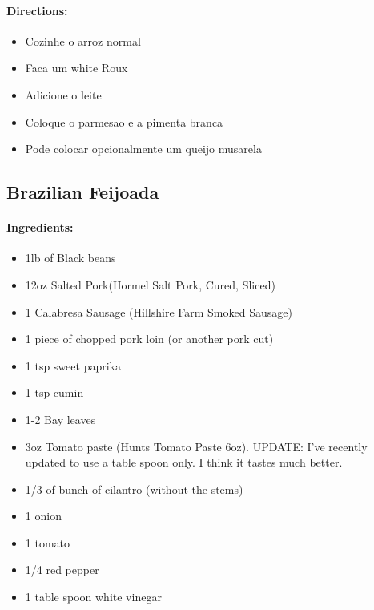 \documentclass{article}
\begin{document}
\paragraph{Directions:}
\begin{itemize}
    \item Cozinhe o arroz normal
    \item Faca um white Roux
    \item Adicione o leite
    \item Coloque o parmesao e a pimenta branca
    \item Pode colocar opcionalmente um queijo musarela
\end{itemize}

\subsection{Brazilian Feijoada}

\paragraph{Ingredients:}
\begin{itemize}
    \item 1lb of Black beans
    \item 12oz Salted Pork(Hormel Salt Pork, Cured, Sliced)
    \item 1 Calabresa Sausage (Hillshire Farm Smoked Sausage)
    \item 1 piece of chopped pork loin (or another pork cut)
    \item 1 tsp sweet paprika
    \item 1 tsp cumin
    \item 1-2 Bay leaves
    \item 3oz Tomato paste (Hunts Tomato Paste 6oz). UPDATE: I've recently updated to use a table spoon only.  I think it tastes much better.
    \item 1/3 of bunch of cilantro (without the stems)
    \item 1 onion
    \item 1 tomato
    \item 1/4 red pepper
    \item 1 table spoon white vinegar
\end{itemize}
\end{document}
